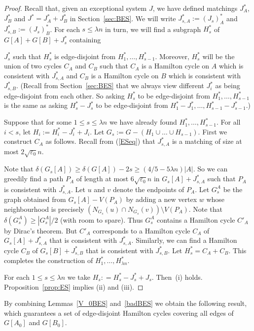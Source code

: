 \documentclass{memo-l}
\def\COMMENT#1{}
\def\eps{\varepsilon}
\def\epszero{\eps_0}
\numberwithin{section}{chapter}
\numberwithin{equation}{section}
\numberwithin{firstthm}{section}
\numberwithin{figure}{section}
\begin{document}
\begin{proof}
Recall that, given an exceptional system $J$, we have defined matchings $J^*_A$, $J^*_B$ and $J^*=J^*_A+J^*_B$ in Section~\ref{sec:BES}.
We will write $J_{s,A}^*:=(J_s)_A^*$ and $J_{s,B}^*:=(J_s)_B^*$.
For each $s \le \lambda n$ in turn, we will find a subgraph $H_s^*$ of $G[A]+G[B] +J_s^*$ containing%
    \COMMENT{Daniela: replaced $G+J_s^*$ by $G[A]+G[B] +J_s^*$}
$J_s^*$ such that $H_s^*$ is edge-disjoint from $H_1^*, \dots ,H_{s-1}^*$. 
Moreover, $H_s^*$ will be the union of two cycles $C_A$ and $C_B$ such that $C_A$ is a Hamilton cycle on $A$ which is consistent with
$J_{s,A}^*$ and $C_B$  is a Hamilton cycle on $B$ which is consistent with $J_{s,B}^*$.
(Recall from Section~\ref{sec:BES} that we always view different
$J^*_i$ as being edge-disjoint from each other. So asking $H_s^*$ to be edge-disjoint from $H_1^*, \dots ,H_{s-1}^*$
is the same as asking $H_s^*-J^*_s$ to be edge-disjoint from $H_1^*-J^*_1, \dots ,H_{s-1}^*-J^*_{s-1}$.)

Suppose that for some $1\le s\le \lambda n$ we have already found $H_1^*, \dots ,H_{s-1}^*$. For all $i<s$, let $H_i:=H^*_i-J^*_i+J_i$.
Let $G_s:=G-(H_1\cup\dots \cup H_{s-1})$.
First we construct $C_A$ as follows. Recall from (\ref{ESeq}) that $J_{s,A}^*$ is a matching of size at most $2\sqrt{\epszero} n$.%
\COMMENT{Deryk: new extra factor of two here}
Note that $\delta(G_s[A]) \ge \delta(G[A]) - 2s \ge (4/5 - 5 \lambda n ) |A|$.
So we can greedily find a path $P_A$ of length at most $6 \sqrt{\epszero} n$ in $G_s[A] + J_{s,A}^*$ such that
$P_A$ is consistent with $J_{s,A}^*$. Let $u$ and $v$ denote the endpoints of $P_A$.
Let $G_s^A$ be the graph obtained from $G_s[A]-V(P_A)$ by adding a new vertex $w$ whose neighbourhood is precisely
$(N_{G_s}(u) \cap N_{G_s}(v)) \setminus V(P_A)$.
Note that $\delta(G_s^A) \ge |G_s^A|/2$ (with room to spare). Thus $G_s^A$ contains a Hamilton cycle $C'_A$ by Dirac's theorem.
But $C'_A$ corresponds to a Hamilton cycle $C_A$ of $G_s[A]+J_{s,A}^*$ that is consistent with $J_{s,A}^*$.
Similarly, we can find a Hamilton cycle $C_B$ of $G_s[B] +J_{s,B}^*$ that is consistent with $J_{s,B}^*$.
Let $H^*_s=C_A+C_B$. This completes the construction of $H_1^*, \dots ,H_{\lambda n}^*$.

For each $1\le s\le \lambda n$ we take $H_s : = H_s^* - J_s^* +J_s$. Then~(i) holds.
Proposition~\ref{prop:ES} implies (ii) and (iii).
\end{proof}

By combining Lemmas~\ref{V_0BES} and~\ref{badBES} we obtain the following result, which guarantees a set of edge-disjoint
Hamilton cycles covering all edges of $G[A_0]$ and $G[B_0]$.
\end{document}
